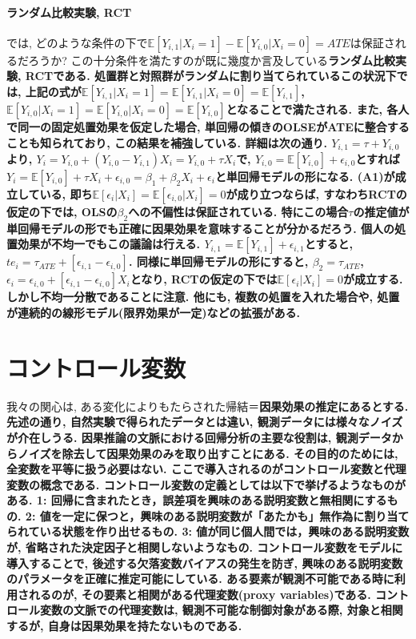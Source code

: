 \documentclass[paper=a4paper,fontsize=10pt]{jlreq}
\begin{document}
\paragraph{ランダム比較実験, RCT}
では, どのような条件の下で$\mathbb{E}[Y_{i,1}|X_i=1]-\mathbb{E}[Y_{i,0}|X_i=0]=ATE$は保証されるだろうか? この十分条件を満たすのが既に幾度か言及している\rmfamily\mcfamily\bfseries{ランダム比較実験, RCT}\mdseries である. 処置群と対照群がランダムに割り当てられているこの状況下では, 上記の式が$\mathbb{E}[Y_{i,1}|X_i=1]=\mathbb{E}[Y_{i,1}|X_i=0]=\mathbb{E}[Y_{i,1}]$, $\mathbb{E}[Y_{i,0}|X_i=1]=\mathbb{E}[Y_{i,0}|X_i=0]=\mathbb{E}[Y_{i,0}]$となることで満たされる. また, 各人で同一の固定処置効果を仮定した場合, 単回帰の傾きのOLSEがATEに整合することも知られており, この結果を補強している. 詳細は次の通り. $Y_{i,1}=\tau + Y_{i,0}$より, $Y_i=Y_{i,0}+(Y_{i,0}-Y_{i,1})X_i=Y_{i,0}+\tau X_i$で, $Y_{i,0}=\mathbb{E}[Y_{i,0}]+\epsilon_{i,0}$とすれば$Y_i=\mathbb{E}[Y_{i,0}]+\tau X_i+\epsilon_{i,0}=\beta_1+\beta_2X_i+\epsilon_i$と単回帰モデルの形になる. (A1)が成立している, 即ち$\mathbb{E}[\epsilon_i|X_i]=\mathbb{E}[\epsilon_{i,0}|X_i]=0$が成り立つならば, すなわちRCTの仮定の下では, OLSの$\beta_2$への不偏性は保証されている. 特にこの場合$\tau$の推定値が単回帰モデルの形でも正確に因果効果を意味することが分かるだろう. 個人の処置効果が不均一でもこの議論は行える. $Y_{i,1}=\mathbb{E}[Y_{i,1}]+\epsilon_{i,1}$とすると, $te_i=\tau_{ATE}+[\epsilon_{i,1}-\epsilon_{i,0}]$. 同様に単回帰モデルの形にすると, $\beta_2=\tau_{ATE}$, $\epsilon_i=\epsilon_{i,0}+[\epsilon_{i,1}-\epsilon_{i,0}]X_i$となり, RCTの仮定の下では$\mathbb{E}[\epsilon_i|X_i]=0$が成立する. しかし不均一分散であることに注意. 他にも, 複数の処置を入れた場合や, 処置が連続的の線形モデル(限界効果が一定)などの拡張がある.\\

\section{コントロール変数}
我々の関心は, ある変化によりもたらされた帰結＝\rmfamily\mcfamily\bfseries{因果効果の推定}\mdseries にあるとする. 先述の通り, 自然実験で得られたデータとは違い, 観測データには様々なノイズが介在しうる. 因果推論の文脈における回帰分析の主要な役割は, 観測データからノイズを除去して因果効果のみを取り出すことにある. その目的のためには, 全変数を平等に扱う必要はない. ここで導入されるのが\rmfamily\mcfamily\bfseries{コントロール変数}\mdseries と\rmfamily\mcfamily\bfseries{代理変数}\mdseries の概念である.  コントロール変数の定義としては以下で挙げるようなものがある. 1: 回帰に含まれたとき，誤差項を興味のある説明変数と無相関にするもの. 2: 値を一定に保つと，興味のある説明変数が「あたかも」無作為に割り当てられている状態を作り出せるもの. 3: 値が同じ個人間では，興味のある説明変数が, 省略された決定因子と相関しないようなもの. コントロール変数をモデルに導入することで, 後述する欠落変数バイアスの発生を防ぎ, 興味のある説明変数のパラメータを正確に推定可能にしている. ある要素が観測不可能である時に利用されるのが, その要素と相関がある\rmfamily\mcfamily\bfseries{代理変数(proxy variables)}\mdseries である. コントロール変数の文脈での代理変数は, 観測不可能な制御対象がある際, 対象と相関するが, 自身は因果効果を持たないものである.\\
\end{document}
